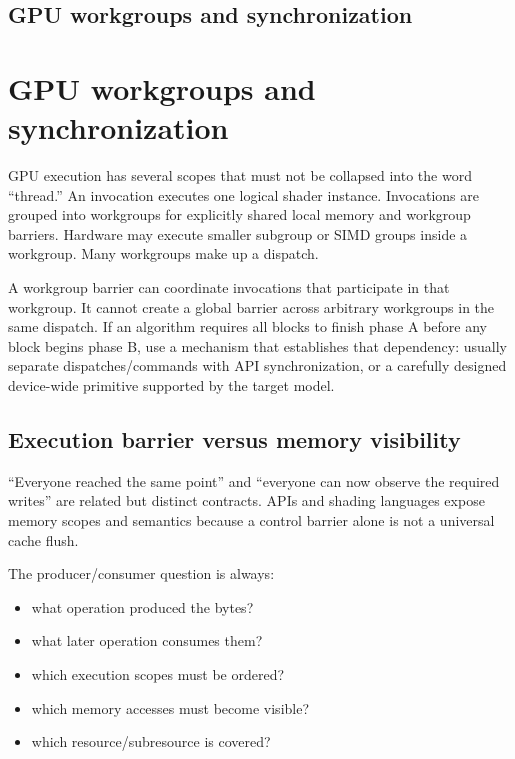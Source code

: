 \hypertarget{appendix-f662b5b1773b}{}
\section*{GPU workgroups and synchronization}
\chapter{GPU workgroups and synchronization}\label{appendix-f662b5b1773b-gpu-workgroups-and-synchronization}

GPU execution has several scopes that must not be collapsed into the word ``thread.'' An invocation executes one logical shader instance. Invocations are grouped into workgroups for explicitly shared local memory and workgroup barriers. Hardware may execute smaller subgroup or SIMD groups inside a workgroup. Many workgroups make up a dispatch.

A workgroup barrier can coordinate invocations that participate in that workgroup. It cannot create a global barrier across arbitrary workgroups in the same dispatch. If an algorithm requires all blocks to finish phase A before any block begins phase B, use a mechanism that establishes that dependency: usually separate dispatches/commands with API synchronization, or a carefully designed device-wide primitive supported by the target model.

\section{Execution barrier versus memory visibility}\label{appendix-f662b5b1773b-execution-barrier-versus-memory-visibility}

``Everyone reached the same point'' and ``everyone can now observe the required writes'' are related but distinct contracts. APIs and shading languages expose memory scopes and semantics because a control barrier alone is not a universal cache flush.

The producer/consumer question is always:

\begin{itemize}
\tightlist
\item
  what operation produced the bytes?
\item
  what later operation consumes them?
\item
  which execution scopes must be ordered?
\item
  which memory accesses must become visible?
\item
  which resource/subresource is covered?
\end{itemize}

